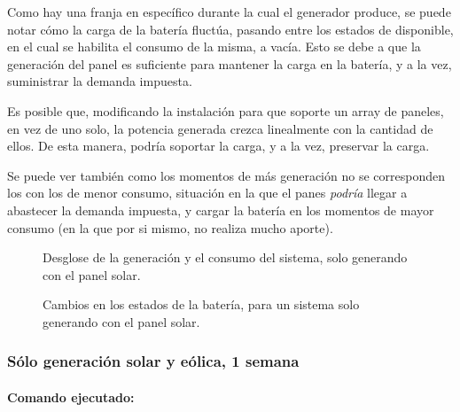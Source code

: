 Como hay una franja en específico durante la cual el generador produce,
se puede notar cómo la carga de la batería fluctúa, pasando entre los
estados de disponible, en el cual se habilita el consumo de la misma, a
vacía. Esto se debe a que la generación del panel es suficiente para
mantener la carga en la batería, y a la vez, suministrar la demanda
impuesta.

Es posible que, modificando la instalación para que soporte un array de
paneles, en vez de uno solo, la potencia generada crezca linealmente con
la cantidad de ellos. De esta manera, podría soportar la carga, y a la
vez, preservar la carga.

Se puede ver también como los momentos de más generación no se
corresponden los con los de menor consumo, situación en la que el panes
\emph{podría} llegar a abastecer la demanda impuesta, y cargar la
batería en los momentos de mayor consumo (en la que por si mismo, no
realiza mucho aporte).

\begin{figure}
    \begin{center}
    \end{center}
    \caption{Desglose de la generación y el consumo del sistema, solo generando con el panel solar.}
\end{figure}
    
\begin{figure}
    \begin{center}
    \end{center}
    \caption{Cambios en los estados de la batería, para un sistema solo generando con el panel solar.}
\end{figure}
    
    \hypertarget{suxf3lo-generaciuxf3n-solar-y-euxf3lica-1-semana}{%
\subsubsection{Sólo generación solar y eólica, 1
semana}\label{suxf3lo-generaciuxf3n-solar-y-euxf3lica-1-semana}}

\hypertarget{comando-ejecutado}{%
\paragraph{Comando ejecutado:}\label{comando-ejecutado}}

